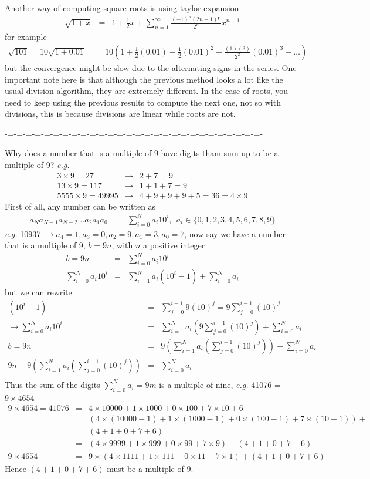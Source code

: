 \documentclass[aps,preprint,preprintnumbers,nofootinbib,showpacs,prd]{revtex4-1}
\newcommand{\eg}{{\it e.g.} }
\newcommand{\nbea}{\begin{eqnarray*}}
\newcommand{\neea}{\end{eqnarray*}}
\begin{document}
Another way of computing square roots is using taylor expansion
%
\nbea
\sqrt{1 + x} & = & 1 + \frac{1}{2} x + \sum^{\infty}_{n=1} \frac{(-1)^n (2n-1)!!}{2^n} x^{n+1}
\neea
%
for example
%
\nbea
\sqrt{101} = 10\sqrt{1 + 0.01} & = & 10 \left (1 + \frac{1}{2} (0.01) - \frac{1}{2} (0.01)^{2} + \frac{(1) (3)}{2^2} (0.01)^{3} + \dots \right )
\neea
%
but the convergence might be slow due to the alternating signs in the series. One important note here is that although the previous method looks a lot like the usual division algorithm, they are extremely different. In the case of roots, you need to keep using the previous results to compute the next one, not so with divisions, this is because divisions are linear while roots are not.

-=-=-=-=-=-=-=-=-=-=-=-=-=-=-=-=-=-=-=-=-=-=-=-=-=-=-=-=-

Why does a number that is a multiple of 9 have digits tham sum up to be a multiple of 9? \eg
%
\nbea
3 \times 9 = 27 & \rightarrow & 2 + 7 = 9 \\
13 \times 9 = 117 & \rightarrow & 1 + 1 + 7 = 9 \\
5555 \times 9 = 49995 & \rightarrow & 4 + 9 + 9 + 9 + 5 = 36 = 4 \times 9
\neea
%
First of all, any number can be written as
%
\nbea
a_Na_{N-1}a_{N-2}\dots a_2a_1a_0 & = & \sum_{i = 0}^{N} a_i 10^i, ~~a_i \in \{0,1,2,3,4,5,6,7,8,9\}
\neea
%
\eg 10937 $\to a_4 = 1, a_3 = 0, a_2 = 9, a_1 = 3, a_0 = 7$, now say we have a number that is a multiple of 9, $b = 9 n$, with $n$ a positive integer
%
\nbea
b = 9 n & = & \sum_{i = 0}^{N} a_i 10^i \\
\sum_{i = 0}^{N} a_i 10^i & = & \sum_{i = 1}^{N} a_i (10^i - 1) + \sum_{i = 0}^{N} a_i
\neea
%
but we can rewrite
%
\nbea
\left (10^i - 1 \right ) & = & \sum_{j = 0}^{i-1} 9(10)^j = 9\sum_{j = 0}^{i-1} (10)^j \\
\rightarrow \sum_{i = 0}^{N} a_i 10^i & = & \sum_{i = 1}^{N} a_i \left (9 \sum_{j = 0}^{i-1} (10)^j \right ) + \sum_{i = 0}^{N} a_i \\
b = 9n & = & 9 \left ( \sum_{i = 1}^{N} a_i \left ( \sum_{j = 0}^{i-1} (10)^j \right ) \right ) + \sum_{i = 0}^{N} a_i \\
9 n - 9 \left ( \sum_{i = 1}^{N} a_i \left ( \sum_{j = 0}^{i-1} (10)^j \right ) \right ) & = & \sum_{i = 0}^{N} a_i \\
\neea
%
Thus the sum of the digits $\sum_{i = 0}^{N} a_i = 9m$ is a multiple of nine, \eg 41076 = $9 \times 4654$
%
\nbea
9 \times 4654 = 41076 & = & 4 \times 10000 + 1 \times 1000 + 0 \times 100 + 7 \times 10 + 6 \\
& = & (4 \times (10000-1) + 1 \times (1000-1) + 0 \times (100-1) + 7 \times (10-1)) + \\
&&  ( 4 + 1 + 0 + 7 + 6) \\
& = & (4 \times 9999 + 1 \times 999 + 0 \times 99 + 7 \times 9) + ( 4 + 1 + 0 + 7 + 6) \\
9 \times 4654 & = & 9 \times (4 \times 1111 + 1 \times 111 + 0 \times 11 + 7 \times 1) + ( 4 + 1 + 0 + 7 + 6)
\neea
%
Hence $ ( 4 + 1 + 0 + 7 + 6)$ must be a multiple of 9.
\end{document}
